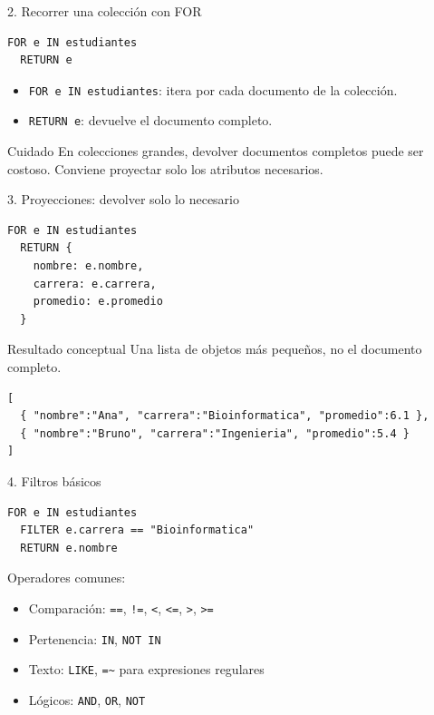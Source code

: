 \documentclass[aspectratio=169,11pt]{beamer}
\begin{document}
\begin{frame}[fragile]{2. Recorrer una colección con FOR}
\begin{lstlisting}
FOR e IN estudiantes
  RETURN e
\end{lstlisting}

\vspace{0.2cm}
\begin{itemize}
  \item \texttt{FOR e IN estudiantes}: itera por cada documento de la colección.
  \item \texttt{RETURN e}: devuelve el documento completo.
\end{itemize}

\begin{alertblock}{Cuidado}
En colecciones grandes, devolver documentos completos puede ser costoso. Conviene proyectar solo los atributos necesarios.
\end{alertblock}
\end{frame}

\begin{frame}[fragile]{3. Proyecciones: devolver solo lo necesario}
\begin{lstlisting}
FOR e IN estudiantes
  RETURN {
    nombre: e.nombre,
    carrera: e.carrera,
    promedio: e.promedio
  }
\end{lstlisting}

\vspace{0.2cm}
\begin{block}{Resultado conceptual}
Una lista de objetos más pequeños, no el documento completo.
\end{block}

\begin{lstlisting}
[
  { "nombre":"Ana", "carrera":"Bioinformatica", "promedio":6.1 },
  { "nombre":"Bruno", "carrera":"Ingenieria", "promedio":5.4 }
]
\end{lstlisting}
\end{frame}

\begin{frame}[fragile]{4. Filtros básicos}
\begin{lstlisting}
FOR e IN estudiantes
  FILTER e.carrera == "Bioinformatica"
  RETURN e.nombre
\end{lstlisting}

\vspace{0.2cm}
Operadores comunes:
\begin{itemize}
  \item Comparación: \texttt{==}, \texttt{!=}, \texttt{<}, \texttt{<=}, \texttt{>}, \texttt{>=}
  \item Pertenencia: \texttt{IN}, \texttt{NOT IN}
  \item Texto: \texttt{LIKE}, \texttt{=\textasciitilde} para expresiones regulares
  \item Lógicos: \texttt{AND}, \texttt{OR}, \texttt{NOT}
\end{itemize}
\end{frame}
\end{document}
